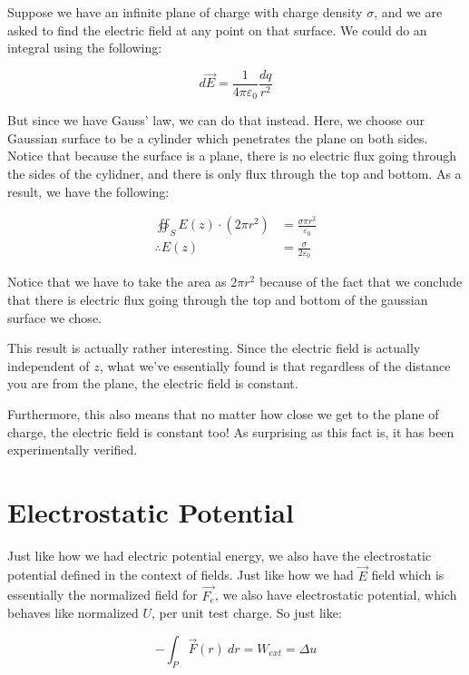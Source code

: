 \documentclass{report}
\theoremstyle{definition}
\numberwithin{equation}{section}
\numberwithin{definition}{section}
\begin{document}
    \begin{example}
        Suppose we have an infinite plane of charge with charge density $\sigma$, and we are asked to find the electric field at any point on that surface. We could do an integral using the following:

        \[ d\vec{E} = \frac{1}{4\pi\varepsilon_0} \frac{dq}{r^2}\]

        But since we have Gauss' law, we can do that instead. Here, we choose our Gaussian surface to be a cylinder which penetrates the plane on both sides. Notice that because the surface is a plane, there is no electric flux going through the sides of the cylidner, and there is only flux through the top and bottom. As a result, we have the following:

        \begin{align*}
            \oiint_S E(z) \cdot (2\pi r^2) &= \frac{\sigma \pi r^2}{\varepsilon_0}\\
            \therefore E(z) &= \frac{\sigma}{2\varepsilon_0}
        \end{align*}

        Notice that we have to take the area as $2\pi r^2$ because of the fact that we conclude that there is electric flux going through the top and bottom of the gaussian surface we chose. 

        This result is actually rather interesting. Since the electric field is actually independent of $z$, what we've essentially found is that regardless of the distance you are from the plane, the electric field is constant.

        Furthermore, this also means that no matter how close we get to the plane of charge, the electric field is constant too! As surprising as this fact is, it has been experimentally verified.

    \end{example}
    \section{Electrostatic Potential}

    Just like how we had electric potential energy, we also have the electrostatic potential defined in the context of fields. Just like how we had $\vec{E}$ field which is essentially the normalized field for $\vec{F_e}$, we also have electrostatic potential, which behaves like normalized $U$, per unit test charge. So just like:

    \[ -\int_{P} \vec{F}(r) \ dr = W_{ext} = \Delta u\]
\end{document}
